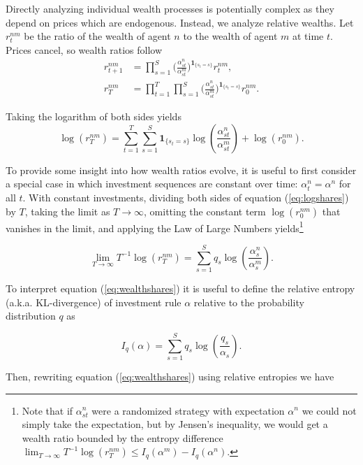 Directly analyzing individual wealth processes is potentially complex as they depend on prices which are endogenous. Instead, we analyze relative wealths. Let $r^{nm}_t$ be the ratio of the wealth of agent $n$ to the wealth of agent $m$ at time $t$. Prices cancel, so wealth ratios follow
\begin{align}
	r^{nm}_{t+1} &=  \prod_{s=1}^S  \bigg(\frac{\alpha^n_{st}}{\alpha^m_{st}}\bigg)^{\mathbf{1}_{\{s_t = s\}}} r^{nm}_t,\\
	r^{nm}_{T}   &= \prod_{t=1}^{T} \prod_{s=1}^S \bigg (\frac{\alpha^n_{st}}{\alpha^m_{st}}\bigg)^{\mathbf{1}_{\{s_t = s\}}} r^{nm}_0.
\end{align}

Taking the logarithm of both sides yields
\begin{equation}\label{eq:logshares}
	\log(r^{nm}_{T}) = \sum_{t=1}^{T}\sum_{s=1} ^S \mathbf{1}_{\{s_t = s\}} \log (\frac{\alpha^n_{st}}{\alpha^m_{st}}) + \log(r^{nm}_{0}). 
\end{equation}

To provide some insight into how wealth ratios evolve, it is useful to first consider a special case in which investment sequences are constant over time: $\alpha^n_t=\alpha^n$ for all $t$. With constant investments, dividing both sides of equation (\ref{eq:logshares}) by $T$, taking the limit as $T\to \infty$, omitting the constant term $\log(r_0^{nm})$ that vanishes in the limit, and applying the Law of Large Numbers yields\footnote{Note that if $\alpha^n_{st}$ were a randomized strategy with expectation $\alpha^n$ we could not simply take the expectation, but by Jensen's inequality, we would get a wealth ratio bounded by the entropy difference $\lim_{T\to \infty} T^{-1} \log(r^{nm}_{T}) \leq I_q(\alpha^m) - I_q(\alpha^n)$.}

\begin{equation}\label{eq:wealthshares}
  \lim_{T\to \infty} T^{-1} \log(r^{nm}_{T}) = \sum_{s=1}^S q_s \log(\frac{\alpha^n_s}{\alpha^m_s}). 
\end{equation}

To interpret equation (\ref{eq:wealthshares}) it is useful to define the relative entropy (a.k.a. KL-divergence) of investment rule $\alpha$ relative to the probability distribution $q$ as

\begin{equation}
    I_q(\alpha) = \sum_{s=1}^S q_s \log(\frac{q_s}{\alpha_s}).
\end{equation}

Then, rewriting equation (\ref{eq:wealthshares}) using relative entropies we have 

